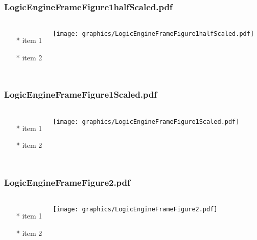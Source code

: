\begin{frame} \frametitle{LogicEngineFrameFigure1halfScaled.pdf}
    \begin{columns}[c]
        \begin{itemize}
            \item[*] item 1
            \item[*] item 2
        \end{itemize}
        \begin{minipage}{\linewidth}
            \begin{center}
            \texttt{[image: graphics/LogicEngineFrameFigure1halfScaled.pdf]}
            \label{gfx:LogicEngineFrameFigure1halfScaled.pdf}
            \end{center}
        \end{minipage}
    \end{columns}
\end{frame}
\begin{frame} \frametitle{LogicEngineFrameFigure1Scaled.pdf}
    \begin{columns}[c]
        \begin{itemize}
            \item[*] item 1
            \item[*] item 2
        \end{itemize}
        \begin{minipage}{\linewidth}
            \begin{center}
            \texttt{[image: graphics/LogicEngineFrameFigure1Scaled.pdf]}
            \label{gfx:LogicEngineFrameFigure1Scaled.pdf}
            \end{center}
        \end{minipage}
    \end{columns}
\end{frame}
\begin{frame} \frametitle{LogicEngineFrameFigure2.pdf}
    \begin{columns}[c]
        \begin{itemize}
            \item[*] item 1
            \item[*] item 2
        \end{itemize}
        \begin{minipage}{\linewidth}
            \begin{center}
            \texttt{[image: graphics/LogicEngineFrameFigure2.pdf]}
            \label{gfx:LogicEngineFrameFigure2.pdf}
            \end{center}
        \end{minipage}
    \end{columns}
\end{frame}
